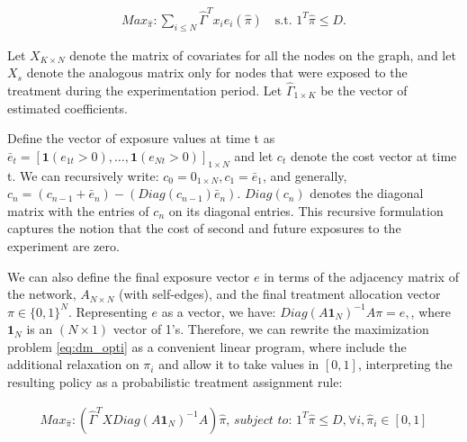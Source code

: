 \documentclass[11pt,a4paper]{article}
\begin{document}
\begin{align}\label{eq:dm_opti}
Max_{\hat \pi} : \sum_{i \leq N} \hat \Gamma^T x_i e_i(\hat \pi)  \quad \mbox{s.t. } 1^T \hat \pi \leq D .
\end{align}

\iffalse
This ends up being equivalent to this minimization (the equivalence to be clarified later):
%

$$ Min_{\hat \pi} E \left( Sup_\pi \left(\sum_{i \leq N} \Gamma^T x_i e_i(\pi) - c_\infty(\pi) \right) - \sum_{i \leq N} \hat \Gamma^T x_i e_i(\hat \pi) + c_\infty(\hat \pi) \right) $$
%
OR (depending on how $\hat \Gamma \rightarrow \Gamma$).

$$ Min_{\pi} E \left( Sup_\pi \left(\sum_{i \leq N} \Gamma^T x_i e_i(\pi) - c_\infty \right) - \sum_{i \leq N}  \Gamma^T x_i e_i(\pi) + \hat c_\infty \right) $$
\fi

Let $X_{K \times N}$ denote the matrix of covariates for all the nodes on the graph, and let $X_s$ denote the analogous matrix only for nodes that were exposed to the treatment during the experimentation period. Let $\hat \Gamma _{1 \times K}$ be the vector of estimated coefficients.

Define the vector of exposure values at time t as $\bar e_t=[\mathbf{1}(e_{1t}>0), \dots, \mathbf{1}(e_{Nt}>0)]_{1 \times N}$ and let $c_t$ denote the cost vector at time t.  We can recursively write: $c_0 = 0_{1 \times N}, c_1 = \bar e_1$, and generally, $c_n = (c_{n-1} + \bar e_n) - (Diag(c_{n-1})  \bar e_n) $. $Diag(c_n)$ denotes the diagonal matrix with the entries of $c_n$ on its diagonal entries. This recursive formulation captures the notion that the cost of second and future exposures to the experiment are zero.

We can also define the final exposure vector $e$ in terms of the adjacency matrix of the network, $A_{N \times N}$ (with self-edges), and the final treatment allocation vector $\pi \in \{0,1\}^N$. Representing $e$ as a vector, we have: $Diag(A \mathbf{1}_{N} ) ^{-1} A\pi  = e,$, where $\mathbf{1}_{N}$ is an $(N \times 1)$ vector of 1's. Therefore, we can rewrite the maximization problem \eqref{eq:dm_opti} as a convenient linear program, where include the additional relaxation on $\pi_i$ and allow it to take values in $[0,1]$, interpreting the resulting policy as a probabilistic treatment assignment rule:

\begin{align}\label{eq:dm_opti_lin}
Max_{\hat \pi}: \left(\hat \Gamma^T X Diag(A \mathbf{1}_{N} ) ^{-1} A \right) \hat \pi  \textit{, subject to: } 1^T \hat \pi \leq D , \forall i, \hat \pi_i \in [0,1]
\end{align}
\end{document}
